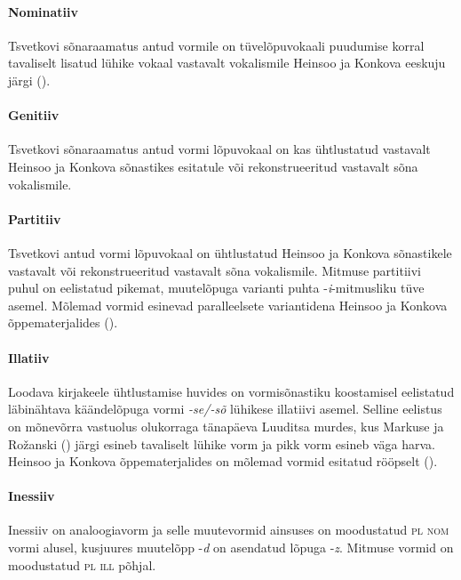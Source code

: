 \documentclass[12pt,a4paper]{article}
\newcommand{\msd}[1]{\textsc{#1}}
\begin{document}
\paragraph*{Nominatiiv}
Tsvetkovi sõnaraamatus antud vormile on tüve\-lõpu\-vokaali puudumise korral tavaliselt lisatud lühike vokaal vastavalt vokalismile Heinsoo ja Konkova eeskuju järgi (\cites[88]{heinsoo_vadsonakopittoja_2015}[10]{konkova_vaddceeli_2014}).


\paragraph*{Genitiiv}
Tsvetkovi sõnaraamatus antud vormi lõpuvokaal on kas ühtlustatud vastavalt Heinsoo ja Konkova sõnastikes esitatule või rekonstrueeritud vastavalt sõna vokalismile.


\paragraph*{Partitiiv}
Tsvetkovi antud vormi lõpuvokaal on ühtlustatud Heinsoo ja Konkova sõnastikele vastavalt või rekonstrueeritud vastavalt sõna vokalismile. Mitmuse partitiivi puhul on eelistatud pikemat, muute\-lõpuga varianti puhta -\textit{i}-mitmusliku tüve asemel. Mõlemad vormid esinevad paralleelsete variantidena Heinsoo ja Konkova õppematerjalides (\cites[88]{heinsoo_vadsonakopittoja_2015}[10]{konkova_vaddceeli_2014}).


\paragraph*{Illatiiv}
Loodava kirjakeele ühtlustamise huvides on vormisõnastiku koostamisel eelistatud läbinähtava käändelõpuga vormi \textit{-se/-sõ} lühikese illatiivi asemel. Selline eelistus on mõnevõrra vastu\-olus olukorraga tänapäeva Luuditsa murdes, kus Markuse ja Rožanski (\citeyear[247]{markus_comitative_2014}) järgi esineb tavaliselt lühike vorm ja pikk vorm esineb väga harva. Heinsoo ja Konkova õppe\-materjalides on mõlemad vormid esitatud rööpselt (\cites[88]{heinsoo_vadsonakopittoja_2015}[10]{konkova_vaddceeli_2014}).


\paragraph*{Inessiiv}
Inessiiv on analoogiavorm ja selle muutevormid ainsuses on moodustatud \msd{pl nom} vormi alusel, kusjuures muutelõpp -\textit{d} on asendatud lõpuga -\textit{z}. Mitmuse vormid on moodustatud \msd{pl ill} põhjal.
\end{document}
